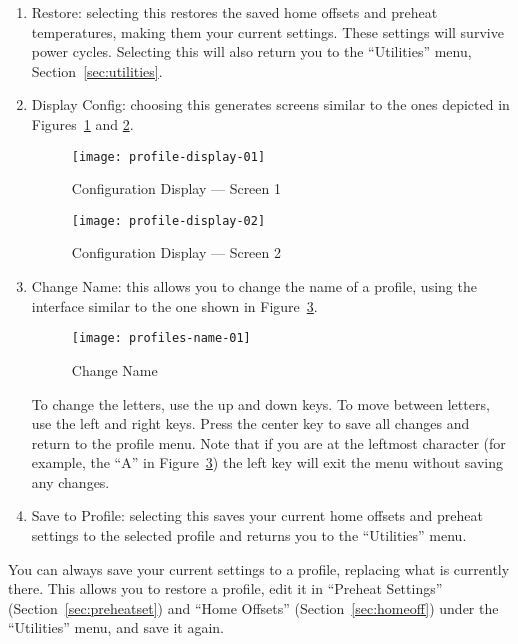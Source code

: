 \begin{enumerate}
\item Restore:\label{sec:profiles-r} selecting this restores the saved home offsets and preheat temperatures, making them your current settings.  These settings will survive power cycles.  Selecting this will also return you to the ``Utilities'' menu, Section~\ref{sec:utilities}.
\item Display Config:\label{sec:profiles-dc} choosing this generates screens similar to the ones depicted in Figures~\ref{fig:cd1} and \ref{fig:cd2}.

\begin{figure}[!htbp]
 \centering
    \texttt{[image: profile-display-01]}
    \caption{Configuration Display --- Screen 1}
  \label{fig:cd1}
\end{figure}

\begin{figure}[!htbp]
  \centering
    \texttt{[image: profile-display-02]}
    \caption{Configuration Display --- Screen 2}
  \label{fig:cd2}
\end{figure}

\item Change Name:\label{sec:profiles-cn} this allows you to change the name of a profile, using the interface similar to the one shown in Figure~\ref{fig:name}.

\begin{figure}[!htbp]
  \centering
    \texttt{[image: profiles-name-01]}
    \caption{Change Name}
  \label{fig:name}
\end{figure}

To change the letters, use the up and down keys.  To move between letters, use the left and right keys.  Press the center key to save all changes and return to the profile menu.  Note that if you are at the leftmost character (for example, the ``A'' in Figure~\ref{fig:name}) the left key will exit the menu without saving any changes.
\item Save to Profile:\label{sec:profiles-sp} selecting this saves your current home offsets and preheat settings to the selected profile and returns you to the ``Utilities'' menu.
\end{enumerate}

You can always save your current settings to a profile, replacing what is currently there.  This allows you to restore a profile, edit it in ``Preheat Settings'' (Section~\ref{sec:preheatset}) and ``Home Offsets'' (Section~\ref{sec:homeoff}) under the ``Utilities'' menu, and save it again.

